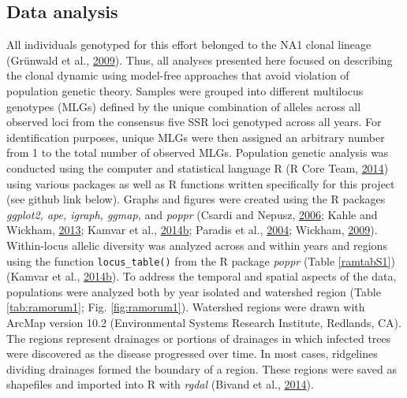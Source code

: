 \documentclass[double,12pt]{beavtex}
\begin{document}
  \subsection{Data analysis}\label{data-analysis-1}
  
  All individuals genotyped for this effort belonged to the NA1 clonal
  lineage (Grünwald et al.,
  \protect\hyperlink{ref-grunwald2009standardizing}{2009}). Thus, all
  analyses presented here focused on describing the clonal dynamic using
  model-free approaches that avoid violation of population genetic theory.
  Samples were grouped into different multilocus genotypes (MLGs) defined
  by the unique combination of alleles across all observed loci from the
  consensus five SSR loci genotyped across all years. For identification
  purposes, unique MLGs were then assigned an arbitrary number from 1 to
  the total number of observed MLGs. Population genetic analysis was
  conducted using the computer and statistical language R (R Core Team,
  \protect\hyperlink{ref-R2014}{2014}) using various packages as well as R
  functions written specifically for this project (see github link below).
  Graphs and figures were created using the R packages \emph{ggplot2, ape,
  igraph, ggmap,} and \emph{poppr} (Csardi and Nepusz,
  \protect\hyperlink{ref-csardi2006igraph}{2006}; Kahle and Wickham,
  \protect\hyperlink{ref-khale2013ggmap}{2013}; Kamvar et al.,
  \protect\hyperlink{ref-kamvar2014poppr}{2014}\protect\hyperlink{ref-kamvar2014poppr}{b};
  Paradis et al., \protect\hyperlink{ref-paradis2004ape}{2004}; Wickham,
  \protect\hyperlink{ref-wickham2009ggplot2}{2009}). Within-locus allelic
  diversity was analyzed across and within years and regions using the
  function \texttt{locus\_table()} from the R package \emph{poppr} (Table
  \ref{ramtabS1}) (Kamvar et al.,
  \protect\hyperlink{ref-kamvar2014poppr}{2014}\protect\hyperlink{ref-kamvar2014poppr}{b}).
  To address the temporal and spatial aspects of the data, populations
  were analyzed both by year isolated and watershed region (Table
  \ref{tab:ramorum1}; Fig. \ref{fig:ramorum1}). Watershed regions were
  drawn with ArcMap version 10.2 (Environmental Systems Research
  Institute, Redlands, CA). The regions represent drainages or portions of
  drainages in which infected trees were discovered as the disease
  progressed over time. In most cases, ridgelines dividing drainages
  formed the boundary of a region. These regions were saved as shapefiles
  and imported into R with \emph{rgdal} (Bivand et al.,
  \protect\hyperlink{ref-bivand2014rgdal}{2014}).
  
\end{document}
